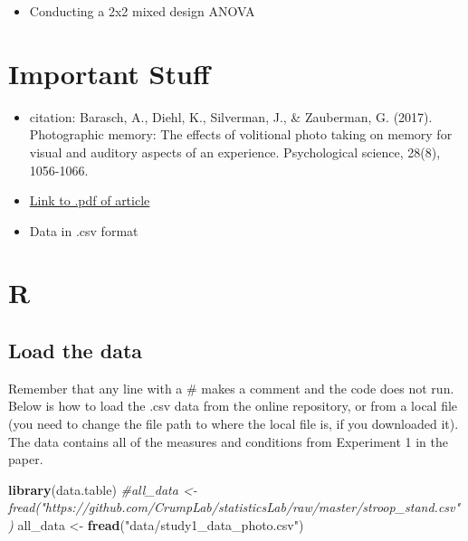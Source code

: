 \documentclass[
]{book}
\newenvironment{Shaded}{\begin{snugshade}}{\end{snugshade}}
\newcommand{\CommentTok}[1]{\textcolor[rgb]{0.56,0.35,0.01}{\textit{#1}}}
\newcommand{\FunctionTok}[1]{\textcolor[rgb]{0.13,0.29,0.53}{\textbf{#1}}}
\newcommand{\NormalTok}[1]{#1}
\newcommand{\OtherTok}[1]{\textcolor[rgb]{0.56,0.35,0.01}{#1}}
\newcommand{\StringTok}[1]{\textcolor[rgb]{0.31,0.60,0.02}{#1}}
\providecommand{\tightlist}{%
  \setlength{\itemsep}{0pt}\setlength{\parskip}{0pt}}
\begin{document}
\begin{itemize}
\tightlist
\item
  Conducting a 2x2 mixed design ANOVA
\end{itemize}

\hypertarget{important-stuff-5}{%
\section{Important Stuff}\label{important-stuff-5}}

\begin{itemize}
\tightlist
\item
  citation: Barasch, A., Diehl, K., Silverman, J., \& Zauberman, G.
  (2017). Photographic memory: The effects of volitional photo taking
  on memory for visual and auditory aspects of an experience.
  Psychological science, 28(8), 1056-1066.
\item
  \href{http://journals.sagepub.com/doi/abs/10.1177/0956797617694868}{Link to .pdf of
  article}
\item
  Data
  in .csv format
\end{itemize}

\hypertarget{r-11}{%
\section{R}\label{r-11}}

\hypertarget{load-the-data-5}{%
\subsection{Load the data}\label{load-the-data-5}}

Remember that any line with a \# makes a comment and the code does not
run. Below is how to load the .csv data from the online repository, or
from a local file (you need to change the file path to where the local
file is, if you downloaded it). The data contains all of the measures
and conditions from Experiment 1 in the paper.

\begin{Shaded}
\begin{Highlighting}[]
\FunctionTok{library}\NormalTok{(data.table)}
\CommentTok{\#all\_data \textless{}{-} fread("https://github.com/CrumpLab/statisticsLab/raw/master/stroop\_stand.csv")}
\NormalTok{all\_data }\OtherTok{\textless{}{-}} \FunctionTok{fread}\NormalTok{(}\StringTok{"data/study1\_data\_photo.csv"}\NormalTok{)}
\end{Highlighting}
\end{Shaded}
\end{document}
